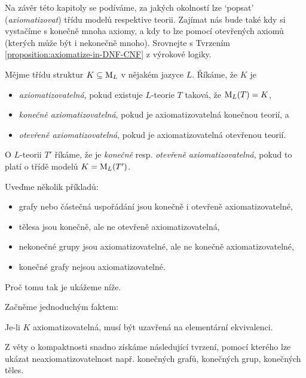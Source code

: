 Na závěr této kapitoly se podíváme, za jakých okolností lze `popsat' (\emph{axiomatizovat}) třídu modelů respektive teorii. Zajímat nás bude také kdy si vystačíme s konečně mnoha axiomy, a kdy to lze pomocí otevřených axiomů (kterých může být i nekonečně mnoho). Srovnejte s Tvrzením \ref{proposition:axiomatize-in-DNF-CNF} z výrokové logiky.

\begin{definition}[Axiomatizovatelnost]
Mějme třídu struktur $K\subseteq\operatorname{M}_L$ v nějakém jazyce $L$. Říkáme, že $K$ je
\begin{itemize}
    \item \emph{axiomatizovatelná}, pokud existuje $L$-teorie $T$ taková, že $\operatorname{M}_L(T)=K$,
    \item \emph{konečně axiomatizovatelná}, pokud je axiomatizovatelná konečnou teorií, a
    \item \emph{otevřeně axiomatizovatelná}, pokud je axiomatizovatelná otevřenou teorií.
\end{itemize}
O $L$-teorii $T'$ říkáme, že je \emph{konečně} resp. \emph{otevřeně axiomatizovatelná}, pokud to platí o třídě modelů $K=\operatorname{M}_L(T')$.
\end{definition}

\begin{example}
    Uveďme několik příkladů:
    \begin{itemize}
        \item grafy nebo částečná uspořádání jsou konečně i otevřeně axiomatizovatelné,
        \item tělesa jsou konečně, ale ne otevřeně axiomatizovatelná,
        \item nekonečné grupy jsou axiomatizovatelné, ale ne konečně axiomatizovatelné,
        \item konečné grafy nejsou axiomatizovatelné.
    \end{itemize}
    Proč tomu tak je ukážeme níže.
\end{example}

Začněme jednoduchým faktem:

\begin{observation}
    Je-li $K$ axiomatizovatelná, musí být uzavřená na elementární ekvivalenci.
\end{observation}

Z věty o kompaktnosti snadno získáme následující tvrzení, pomocí kterého lze ukázat neaxiomatizovatelnost např. konečných grafů, konečných grup, konečných těles.

